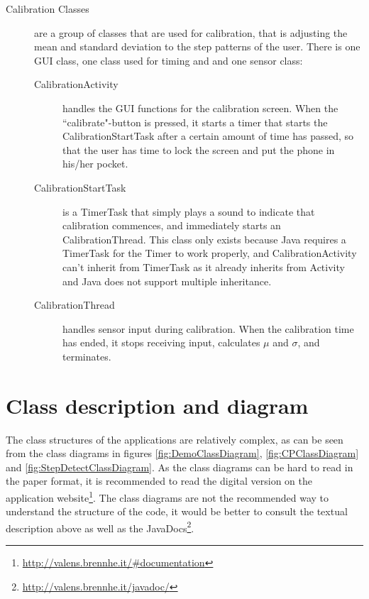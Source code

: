 \begin{description}
\item[Calibration Classes]
are a group of classes that are used for calibration, that is adjusting the mean and standard deviation to the step patterns of the user. There is one GUI class, one class used for timing and and one sensor class:
\begin{description}
\item[CalibrationActivity]
handles the GUI functions for the calibration screen. When the ``calibrate"-button is pressed, it starts a timer that starts the CalibrationStartTask after a certain amount of time has passed, so that the user has time to lock the screen and put the phone in his/her pocket.
\item[CalibrationStartTask]
is a TimerTask that simply plays a sound to indicate that calibration commences, and immediately starts an CalibrationThread. This class only exists because Java requires a TimerTask for the Timer to work properly, and CalibrationActivity can't inherit from TimerTask as it already inherits from Activity and Java does not support multiple inheritance. 
\item[CalibrationThread]
handles sensor input during calibration. When the calibration time has ended, it stops receiving input, calculates $\mu$ and $\sigma$, and terminates.
\end{description}
 
\end{description}
\section{Class description and diagram}

The class structures of the applications are relatively complex, as can be seen from the class diagrams in figures \ref{fig:DemoClassDiagram}, \ref{fig:CPClassDiagram} and \ref{fig:StepDetectClassDiagram}. As the class diagrams can be hard to read in the paper format, it is recommended to read the digital version on the application website\footnote{\url{http://valens.brennhe.it/\#documentation}}. The class diagrams are not the recommended way to understand the structure of the code, it would be better to consult the textual description above as well as the JavaDocs\footnote{\url{http://valens.brennhe.it/javadoc/}}.

